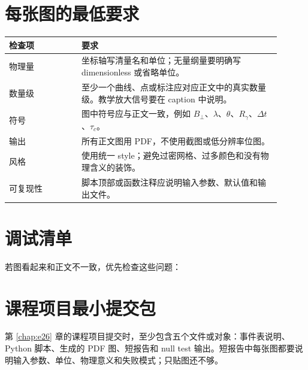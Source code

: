 \section{每张图的最低要求}
\label{appsec:e-figure-requirements}

\begin{longtable}{p{0.24\linewidth}p{0.66\linewidth}}
\toprule
检查项 & 要求 \\
\midrule
物理量 & 坐标轴写清量名和单位；无量纲量要明确写 dimensionless 或省略单位。 \\
数量级 & 至少一个曲线、点或标注应对应正文中的真实数量级。教学放大信号要在 caption 中说明。 \\
符号 & 图中符号应与正文一致，例如 \(B_\perp\)、\(\lambda\)、\(\theta\)、\(R_\gamma\)、\(\Delta t\)、\(\tau_c\)。 \\
输出 & 所有正文图用 PDF，不使用截图或低分辨率位图。 \\
风格 & 使用统一 style；避免过密网格、过多颜色和没有物理含义的装饰。 \\
可复现性 & 脚本顶部或函数注释应说明输入参数、默认值和输出文件。 \\
\bottomrule
\end{longtable}

\section{调试清单}
\label{appsec:e-debug}

若图看起来和正文不一致，优先检查这些问题：


\section{课程项目最小提交包}
\label{appsec:e-project-package}

第 \ref{chap:e26} 章的课程项目提交时，至少包含五个文件或对象：事件表说明、Python 脚本、生成的 PDF 图、短报告和 null test 输出。短报告中每张图都要说明输入参数、单位、物理意义和失败模式；只贴图还不够。
